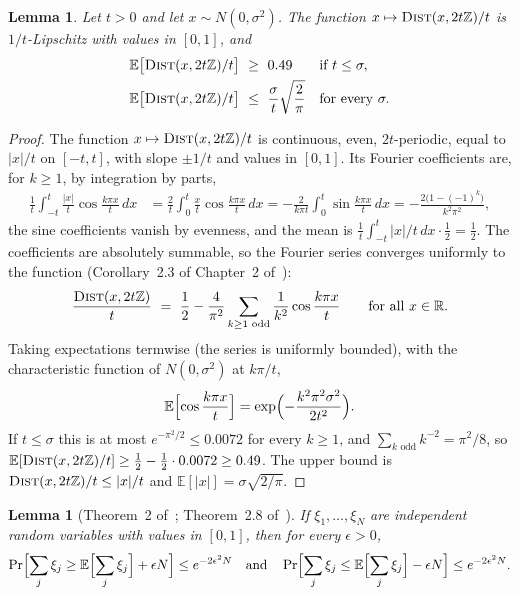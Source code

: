 \documentclass[11pt]{article}
\newtheorem{lemma}[theorem]{Lemma}
\theoremstyle{remark}
\newcommand{\R}{\mathbb R}
\newcommand{\Ex}{\mathbb E}
\newcommand{\Z}{\mathbb Z}
\newcommand{\dist}{\textsc{Dist}}
\begin{document}
\begin{lemma}\label{lem:packed-wave}
Let $t>0$ and let $x\sim N(0,\sigma^{2})$.
The function $x\mapsto\dist(x,2t\Z)/t$ is $1/t$-Lipschitz with values in
$[0,1]$, and
\begin{align*}
\Ex\bigl[\dist(x,2t\Z)/t\bigr]&\ \ge\ 0.49 &&\text{if }t\le\sigma,\\
\Ex\bigl[\dist(x,2t\Z)/t\bigr]&\ \le\ \frac{\sigma}{t}\sqrt{\frac2\pi}
&&\text{for every }\sigma .
\end{align*}
\end{lemma}
\begin{proof}
The function $x\mapsto\dist(x,2t\Z)/t$ is continuous, even, $2t$-periodic,
equal to $|x|/t$ on $[-t,t]$, with slope $\pm1/t$ and values in $[0,1]$.
Its Fourier coefficients are, for $k\ge1$, by integration by parts,
\begin{align*}
\frac1t\int_{-t}^{t}\frac{|x|}{t}\cos\frac{k\pi x}{t}\,dx
&=\frac2t\int_{0}^{t}\frac{x}{t}\cos\frac{k\pi x}{t}\,dx
=-\frac{2}{k\pi t}\int_{0}^{t}\sin\frac{k\pi x}{t}\,dx
=-\frac{2\bigl(1-(-1)^{k}\bigr)}{k^{2}\pi^{2}},
\end{align*}
the sine coefficients vanish by evenness, and the mean is
$\frac1t\int_{-t}^{t}|x|/t\,dx\cdot\frac12=\frac12$.
The coefficients are absolutely summable, so the Fourier series converges
uniformly to the function (Corollary~2.3 of Chapter~2
of~\cite{SS03:book}):
\[
\frac{\dist(x,2t\Z)}{t}\ =\ \frac12-\frac{4}{\pi^{2}}\sum_{k\ge1\text{ odd}}
\frac{1}{k^{2}}\cos\frac{k\pi x}{t}\qquad\text{for all }x\in\R .
\]
Taking expectations termwise (the series is uniformly bounded), with the
characteristic function of $N(0,\sigma^{2})$ at $k\pi/t$,
\[
\Ex\Bigl[\cos\frac{k\pi x}{t}\Bigr]
=\exp\Bigl(-\frac{k^{2}\pi^{2}\sigma^{2}}{2t^{2}}\Bigr).
\]
If $t\le\sigma$ this is at most $e^{-\pi^{2}/2}\le0.0072$ for every $k\ge1$,
and $\sum_{k\text{ odd}}k^{-2}=\pi^{2}/8$, so
$\Ex[\dist(x,2t\Z)/t]\ge\frac12-\frac12\cdot0.0072\ge0.49$.
The upper bound is $\dist(x,2t\Z)/t\le|x|/t$ and
$\Ex[|x|]=\sigma\sqrt{2/\pi}$.
\end{proof}

\begin{lemma}[Theorem~2 of~\cite{H63:journal}; Theorem~2.8 of~\cite{BLM13:book}]
\label{lem:packed-hoeffding}
If $\xi_1,\dots,\xi_{N}$ are independent random variables with values in
$[0,1]$, then for every $\epsilon>0$,
\[
\Pr\Bigl[\sum_j\xi_j\ge\Ex\Bigl[\sum_j\xi_j\Bigr]+\epsilon N\Bigr]
\le e^{-2\epsilon^{2}N}
\quad\text{and}\quad
\Pr\Bigl[\sum_j\xi_j\le\Ex\Bigl[\sum_j\xi_j\Bigr]-\epsilon N\Bigr]
\le e^{-2\epsilon^{2}N}.
\]
\end{lemma}
\end{document}
